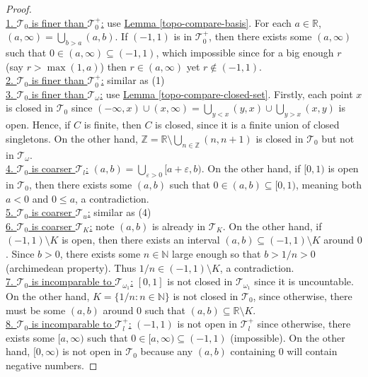\documentclass{treatise}
\begin{document}
\begin{proof} \ \\
\underline{1. $\mathcal{T}_0$ is finer than $\mathcal{T}_0^+$:} use \hyperref[topo-compare-basis]{Lemma \ref*{topo-compare-basis}}. For each $a \in \mathbb{R}$, $(a, \infty) = \bigcup_{b > a} (a, b)$. If $(-1, 1)$ is in $\mathcal{T}_0^+$, then there exists some $(a, \infty)$ such that $0 \in (a, \infty) \subseteq (-1, 1)$, which impossible since for a big enough $r$ (say $r > \max(1, a)$) then $r \in (a, \infty)$ yet $r \notin (-1, 1)$.
\\
\underline{2. $\mathcal{T}_0$ is finer than $\mathcal{T}_0^+$:} similar as (1)
\\
\underline{3. $\mathcal{T}_0$ is finer than $\mathcal{T}_\omega$:} use \hyperref[topo-compare-closed-set]{Lemma \ref*{topo-compare-closed-set}}. Firstly, each point $x$ is closed in $\mathcal{T}_0$ since $(-\infty, x) \cup (x, \infty) = \bigcup_{y < x} (y, x) \cup \bigcup_{y > x} (x, y)$ is open. Hence, if $C$ is finite, then $C$ is closed, since it is a finite union of closed singletons. On the other hand, $\mathbb{Z} = \mathbb{R} \setminus \bigcup_{n \in \mathbb{Z}} (n, n + 1)$ is closed in $\mathcal{T}_0$ but not in $\mathcal{T}_\omega$.
\\
\underline{4. $\mathcal{T}_0$ is coarser $\mathcal{T}_l$:} $(a, b) = \bigcup_{\varepsilon > 0} [a + \varepsilon, b)$. On the other hand, if $[0, 1)$ is open in $\mathcal{T}_0$, then there exists some $(a, b)$ such that $0 \in (a, b) \subseteq [0, 1)$, meaning both $a < 0$ and $0 \leq a$, a contradiction.
\\
\underline{5. $\mathcal{T}_0$ is coarser $\mathcal{T}_u$:} similar as (4)
\\
\underline{6. $\mathcal{T}_0$ is coarser $\mathcal{T}_K$:} note $(a, b)$ is already in $\mathcal{T}_K$. On the other hand, if $(-1, 1) \setminus K$ is open, then there exists an interval $(a, b) \subseteq (-1, 1) \setminus K$ around $0$. Since $b > 0$, there exists some $n \in \mathbb{N}$ large enough so that $b > 1/n > 0$ (archimedean property). Thus $1/n \in (-1, 1) \setminus K$, a contradiction.
\\
\underline{7. $\mathcal{T}_0$ is incomparable to $\mathcal{T}_{\omega_1}$:} $[0, 1]$ is not closed in $\mathcal{T}_{\omega_1}$ since it is uncountable. On the other hand, $K = \{ 1/n : n \in \mathbb{N} \}$ is not closed in $\mathcal{T}_0$, since otherwise, there must be some $(a, b)$ around $0$ such that $(a, b) \subseteq \mathbb{R} \setminus K$.
\\
\underline{8. $\mathcal{T}_0$ is incomparable to $\mathcal{T}_l^+$:} $(-1, 1)$ is not open in $\mathcal{T}_l^+$ since otherwise, there exists some $[a, \infty)$ such that $0 \in [a, \infty) \subseteq (-1, 1)$ (impossible). On the other hand, $[0, \infty)$ is not open in $\mathcal{T}_0$ because any $(a, b)$ containing $0$ will contain negative numbers.

\end{proof}
\end{document}
